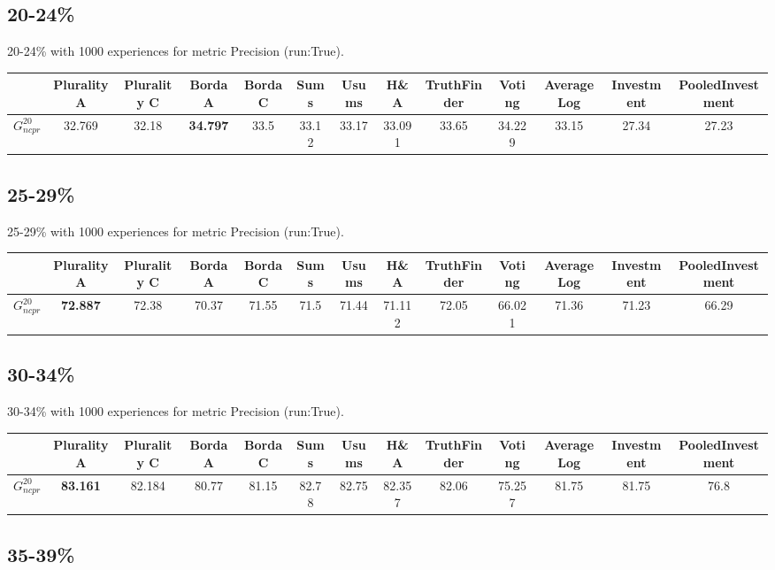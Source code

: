 \documentclass{article}
\newcommand{\graph}[2]{$G_{#1}^{#2}$}
\begin{document}
\subsection{20-24\%}

20-24\% with 1000 experiences for metric Precision (run:True).

\noindent\begin{tabular}{|l|c|c|c|c|c|c|c|c|c|c|c|c|}
\hline
& Plurality A& Plurality C& Borda A& Borda C& Sums& Usums& H\&A& TruthFinder& Voting& AverageLog& Investment& PooledInvestment\\
\hline
\graph{ncpr}{20} &32.769&32.18&\textbf{34.797}&33.5&33.12&33.17&33.091&33.65&34.229&33.15&27.34&27.23\\
\hline
\end{tabular}
\newpage

\subsection{25-29\%}

25-29\% with 1000 experiences for metric Precision (run:True).

\noindent\begin{tabular}{|l|c|c|c|c|c|c|c|c|c|c|c|c|}
\hline
& Plurality A& Plurality C& Borda A& Borda C& Sums& Usums& H\&A& TruthFinder& Voting& AverageLog& Investment& PooledInvestment\\
\hline
\graph{ncpr}{20} &\textbf{72.887}&72.38&70.37&71.55&71.5&71.44&71.112&72.05&66.021&71.36&71.23&66.29\\
\hline
\end{tabular}
\newpage

\subsection{30-34\%}

30-34\% with 1000 experiences for metric Precision (run:True).

\noindent\begin{tabular}{|l|c|c|c|c|c|c|c|c|c|c|c|c|}
\hline
& Plurality A& Plurality C& Borda A& Borda C& Sums& Usums& H\&A& TruthFinder& Voting& AverageLog& Investment& PooledInvestment\\
\hline
\graph{ncpr}{20} &\textbf{83.161}&82.184&80.77&81.15&82.78&82.75&82.357&82.06&75.257&81.75&81.75&76.8\\
\hline
\end{tabular}
\newpage

\subsection{35-39\%}
\end{document}
